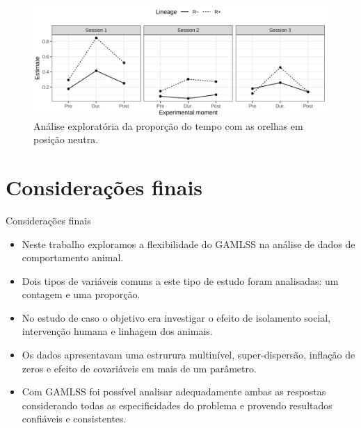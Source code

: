 \documentclass[
  ignorenonframetext,
  serif,
  professionalfont,
  usenames,
  dvipsnames,
  aspectratio = 169]{beamer}
\begin{document}
\begin{frame}{}
\protect\hypertarget{section-5}{}
\begin{figure}

{\centering \includegraphics[width=0.95\linewidth]{./img/interaction} 

}

\caption{Análise exploratória da proporção do tempo com as orelhas em posição neutra.}\label{fig:unnamed-chunk-14}
\end{figure}
\end{frame}

\hypertarget{considerauxe7uxf5es-finais}{%
\section{Considerações finais}\label{considerauxe7uxf5es-finais}}

\begin{frame}{Considerações finais}
\protect\hypertarget{considerauxe7uxf5es-finais-1}{}
\begin{itemize}
\item
  Neste trabalho exploramos a flexibilidade do GAMLSS na análise de
  dados de comportamento animal.
\item
  Dois tipos de variáveis comuns a este tipo de estudo foram analisadas:
  um contagem e uma proporção.
\item
  No estudo de caso o objetivo era investigar o efeito de isolamento
  social, intervenção humana e linhagem dos animais.
\item
  Os dados apresentavam uma estrurura multinível, super-dispersão,
  inflação de zeros e efeito de covariáveis em mais de um parâmetro.
\item
  Com GAMLSS foi possível analisar adequadamente ambas as respostas
  considerando todas as especificidades do problema e provendo
  resultados confiáveis e consistentes.
\end{itemize}
\end{frame}
\end{document}
